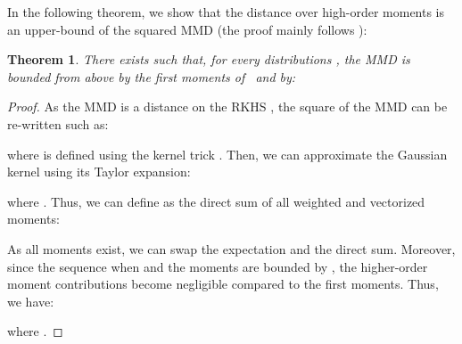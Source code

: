 \documentclass[10pt,twocolumn,letterpaper]{article}
\newtheorem{theorem}{Theorem}
\begin{document}
        In the following theorem, we show that the distance over high-order moments is an upper-bound of the squared MMD (the proof mainly follows \cite{Gretton_2007_NIPS}):
        
        \begin{theorem}\label{th:upper_bound}
            There exists  such that, for every distributions , the MMD is bounded from above by the  first moments of \  and  by:
            
        \end{theorem}
        
        \begin{proof}
            As the MMD is a distance on the RKHS  \cite{Gretton_2007_NIPS}, the square of the MMD can be re-written such as:
            
            where  is defined using the kernel trick .
            Then, we can approximate the Gaussian kernel using its Taylor expansion:
            
            where .
            Thus, we can define  as the direct sum of all weighted and vectorized moments:
            
            As all moments exist, we can swap the expectation and the direct sum.
            Moreover, since the sequence  when  and the moments are bounded by , the higher-order moment contributions become negligible compared to the  first moments. 
            Thus, we have:
            
            where .
        \end{proof}
        
\end{document}
